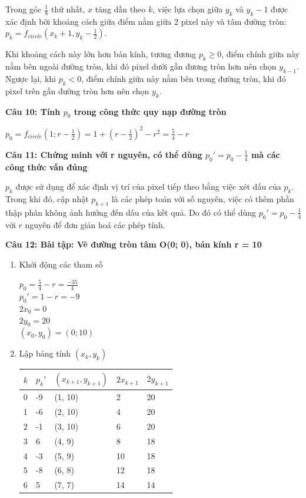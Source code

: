 Trong góc $\frac{1}{8}$ thứ nhất, $x$ tăng dần theo $k$, việc lựa chọn giữa $y_k$ và $y_k - 1$ được xác định bởi khoảng cách giữa điểm nằm giữa 2 pixel này và tâm đường tròn: $p_k = f_{circle}(x_k + 1, y_k - \frac{1}{2})$.

Khi khoảng cách này lớn hơn bán kính, tương đương $p_k \ge 0$, điểm chính giữa này nằm bên ngoài đường tròn, khi đó pixel dưới gần đương tròn hơn nên chọn $y_{k-1}$. Ngược lại, khi $p_k < 0$, điểm chính giữa này nằm bên trong đường tròn, khi đó pixel trên gần đường tròn hơn nên chọn $y_k$.

\textbf{Câu 10: Tính $p_0$ trong công thức quy nạp đường tròn}

$p_0 = f_{circle}(1; r - \frac{1}{2}) = 1 + (r - \frac{1}{2})^2 - r^2 = \frac{5}{4} - r$

\textbf{Câu 11: Chứng minh với r nguyên, có thể dùng $p_0' = p_0 - \frac{1}{4}$ mà các công thức vẫn đúng}

$p_k$ được sử dụng để xác định vị trí của pixel tiếp theo bằng việc xét dấu của $p_k$. Trong khi đó, cập nhật $p_{k+1}$ là các phép toán với số nguyên, việc có thêm phần thập phân không ảnh hưởng đến dấu của kết quả. Do đó có thể dùng $p_0' = p_0 - \frac{1}{4}$ với $r$ nguyên để đơn giản hoá các phép tính.

\textbf{Câu 12: Bài tập: Vẽ đường tròn tâm O(0; 0), bán kính r = 10}

\begin{enumerate}
	\item Khởi động các tham số
	
	$p_0 = \frac{5}{4} - r = \frac{-35}{4}$\\
	$p_0' = 1 - r = -9$\\
	$2x_0=0$\\
	$2y_0=20$\\
	$(x_0, y_0) = (0; 10)$
	
	\item Lập bảng tính $(x_k, y_k)$
	
	\begin{table}[H]
		\centering
		\begin{tabular}{|l|l|l|l|l|}
			\hline
			$k$ & $p_k'$ & $(x_{k + 1}, y_{k + 1})$ & $2 x_{k + 1}$ & $2 y_{k + 1}$ \\ \hline
			0 & -9 & (1, 10) & 2 & 20 \\ \hline
			1 & -6 & (2, 10) & 4 & 20 \\ \hline
			2 & -1 & (3, 10) & 6 & 20 \\ \hline
			3 & 6 & (4, 9) & 8 & 18 \\ \hline
			4 & -3 & (5, 9) & 10 & 18 \\ \hline
			5 & -8 & (6, 8) & 12 & 18 \\ \hline
			6 & 5 & (7, 7) & 14 & 14 \\ \hline
		\end{tabular}
	\end{table}
\end{enumerate}

